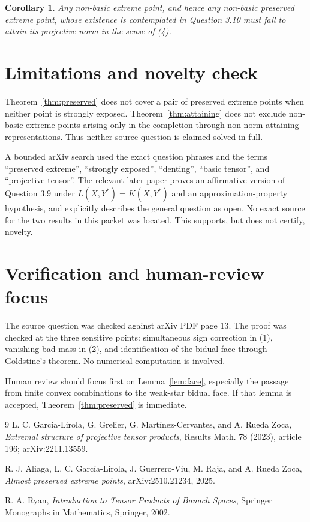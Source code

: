 \documentclass[11pt]{article}
\newtheorem{corollary}[theorem]{Corollary}
\begin{document}
\begin{corollary}
Any non-basic extreme point, and hence any non-basic preserved extreme point,
whose existence is contemplated in Question 3.10 must fail to attain its
projective norm in the sense of (4).
\end{corollary}

\section{Limitations and novelty check}

Theorem~\ref{thm:preserved} does not cover a pair of preserved extreme points
when neither point is strongly exposed. Theorem~\ref{thm:attaining} does not
exclude non-basic extreme points arising only in the completion through
non-norm-attaining representations. Thus neither source question is claimed
solved in full.

A bounded arXiv search used the exact question phrases and the terms
``preserved extreme'', ``strongly exposed'', ``denting'', ``basic tensor'',
and ``projective tensor''. The relevant later paper \cite{APEP} proves an
affirmative version of Question 3.9 under
$L(X,Y^*)=K(X,Y^*)$ and an approximation-property hypothesis, and explicitly
describes the general question as open. No exact source for the two results in
this packet was located. This supports, but does not certify, novelty.

\section{Verification and human-review focus}

The source question was checked against arXiv PDF page 13. The proof was
checked at the three sensitive points: simultaneous sign correction in (1),
vanishing bad mass in (2), and identification of the bidual face through
Goldstine's theorem. No numerical computation is involved.

Human review should focus first on Lemma~\ref{lem:face}, especially the passage
from finite convex combinations to the weak-star bidual face. If that lemma is
accepted, Theorem~\ref{thm:preserved} is immediate.

\begin{thebibliography}{9}
L. C. Garc\'ia-Lirola, G. Grelier, G. Mart\'inez-Cervantes, and A. Rueda Zoca,
\emph{Extremal structure of projective tensor products},
Results Math. 78 (2023), article 196; arXiv:2211.13559.

R. J. Aliaga, L. C. Garc\'ia-Lirola, J. Guerrero-Viu, M. Raja, and
A. Rueda Zoca,
\emph{Almost preserved extreme points}, arXiv:2510.21234, 2025.

R. A. Ryan,
\emph{Introduction to Tensor Products of Banach Spaces},
Springer Monographs in Mathematics, Springer, 2002.
\end{thebibliography}
\end{document}
